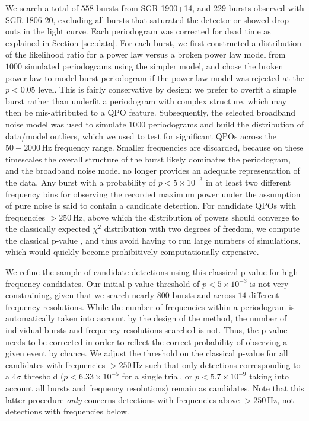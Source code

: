 \documentclass[numberedappendix]{emulateapj}
\newcommand{\hz}{\,\mathrm{Hz}}
\begin{document}
We search a total of $558$ bursts from SGR 1900+14, and $229$ bursts observed with SGR 1806-20, excluding all bursts that saturated the detector or showed drop-outs in the light curve. 
Each periodogram was corrected for dead time as explained in Section \ref{sec:data}. 
For each burst, we first constructed a distribution of the likelihood ratio for a power law versus a broken power law model from $1000$ simulated periodograms using the simpler model, and
chose the broken power law to model burst periodogram if the power law model was rejected at the $p < 0.05$ level. This is fairly conservative by design: we prefer to overfit a simple burst rather than underfit a periodogram 
with complex structure, which may then be mis-attributed to a QPO feature. Subsequently, the selected broadband noise model was used to simulate $1000$ periodograms and build the
distribution of data/model outliers, which we used to test for significant QPOs across the $50 - 2000 \hz$ frequency range. Smaller frequencies are discarded, because on these timescales the overall structure of
the burst likely dominates the periodogram, and the broadband noise model no longer provides an adequate representation of the data. Any burst with a probability of $p < 5 \times 10^{-3}$ in at least two different frequency bins
for observing the recorded maximum power under the assumption of pure noise is said to contain a candidate detection. For candidate QPOs with frequencies $> 250 \hz$, above which the distribution of powers
should converge to the classically expected $\chi^2$ distribution with two degrees of freedom, we compute the classical p-value \citep{groth1975}, and thus avoid having to run large numbers of simulations, which 
would quickly become prohibitively computationally expensive. 

We refine the sample of candidate detections using this classical p-value for high-frequency candidates. Our initial p-value threshold of $p < 5 \times 10^{-3}$ is not very constraining, given that we search nearly $800$ bursts and 
across $14$ different frequency resolutions. While the number of frequencies within a periodogram is automatically taken into account by the design of the method, the number of individual bursts and frequency resolutions
searched is not. Thus, the p-value needs to be corrected in order to reflect the correct probability of observing a given event by chance. We adjust the threshold on the classical p-value for all candidates with frequencies
$> 250 \hz$ such that only detections corresponding to a $4\sigma$ threshold ($p < 6.33 \times 10^{-5}$ for a single trial, or $p < 5.7 \times 10^{-9}$ taking into account all bursts and frequency resolutions) remain
as candidates. Note that this latter procedure {\it only} concerns detections with frequencies above $> 250 \hz$, not detections with frequencies below.
\end{document}
